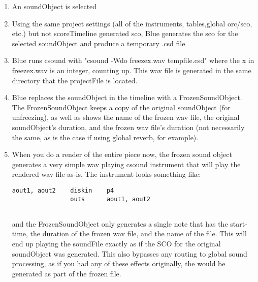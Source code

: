 \begin{enumerate}
\def\labelenumi{\arabic{enumi}.}
\item
  An soundObject is selected
\item
  Using the same project settings (all of the instruments, tables,global
  orc/sco, etc.) but not scoreTimeline generated sco, Blue generates the
  sco for the selected soundObject and produce a temporary .csd file
\item
  Blue runs csound with "csound -Wdo freezex.wav tempfile.csd" where the
  x in freezex.wav is an integer, counting up. This wav file is
  generated in the same directory that the projectFile is located.
\item
  Blue replaces the soundObject in the timeline with a
  FrozenSoundObject. The FrozenSoundObject keeps a copy of the original
  soundObject (for unfreezing), as well as shows the name of the frozen
  wav file, the original soundObject's duration, and the frozen wav
  file's duration (not necessarily the same, as is the case if using
  global reverb, for example).
\item
  When you do a render of the entire piece now, the frozen sound object
  generates a very simple wav playing csound instrument that will play
  the rendered wav file as-is. The instrument looks something like:

\begin{verbatim}
aout1, aout2    diskin    p4         
                outs      aout1, aout2 
          
\end{verbatim}

  and the FrozenSoundObject only generates a single note that has the
  start-time, the duration of the frozen wav file, and the name of the
  file. This will end up playing the soundFile exactly as if the SCO for
  the original soundObject was generated. This also bypasses any routing
  to global sound processing, as if you had any of these effects
  originally, the would be generated as part of the frozen file.
\end{enumerate}

